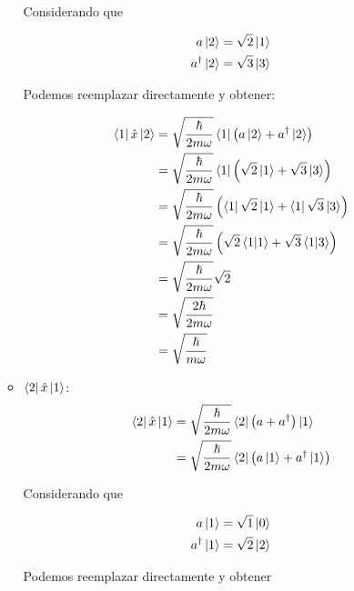 \documentclass[12pt]{exam}
\begin{document}
\begin{enumerate}
\begin{itemize}
				Considerando que

				\begin{align}
					a\left|2\right> &= \sqrt{2}\left|1\right>\nonumber\\
					a^{\dagger}\left|2\right> &= \sqrt{3}\left|3\right>\nonumber
				\end{align}

				Podemos reemplazar directamente y obtener:

				\begin{align}
					\left<1\right|\hat{x}\left|2\right> &= \sqrt{\frac{\hbar}{2m\omega}}\left<1\right|\left(a\left|2\right> + a^{\dagger}\left|2\right>\right)\nonumber\\
					&= \sqrt{\frac{\hbar}{2m\omega}}\left<1\right|\left(\sqrt{2}\left|1\right> + \sqrt{3}\left|3\right>\right)\nonumber\\
					&= \sqrt{\frac{\hbar}{2m\omega}}\left(\left<1\right|\sqrt{2}\left|1\right> + \left<1\right|\sqrt{3}\left|3\right>\right)\nonumber\\
					&= \sqrt{\frac{\hbar}{2m\omega}}\left(\sqrt{2}\left<1|1\right> + \sqrt{3}\left<1|3\right>\right)\nonumber\\
					&= \sqrt{\frac{\hbar}{2m\omega}}\sqrt{2}\nonumber\\
					&= \sqrt{\frac{2\hbar}{2m\omega}}\nonumber\\
					&= \sqrt{\frac{\hbar}{m\omega}}\label{eq:1_3_1_2}
				\end{align}
			\item $\left<2\right|\hat{x}\left|1\right>$:
				\begin{align}
					\left<2\right|\hat{x}\left|1\right> &= \sqrt{\frac{\hbar}{2m\omega}}\left<2\right|\left(a + a^{\dagger}\right)\left|1\right>\nonumber\\
					&= \sqrt{\frac{\hbar}{2m\omega}}\left<2\right|\left(a\left|1\right> + a^{\dagger}\left|1\right>\right)\nonumber
				\end{align}

				Considerando que

				\begin{align}
					a\left|1\right> &= \sqrt{1}\left|0\right>\nonumber\\
					a^{\dagger}\left|1\right> &= \sqrt{2}\left|2\right>\nonumber
				\end{align}

				Podemos reemplazar directamente y obtener


\end{itemize}
\end{enumerate}
\end{document}
